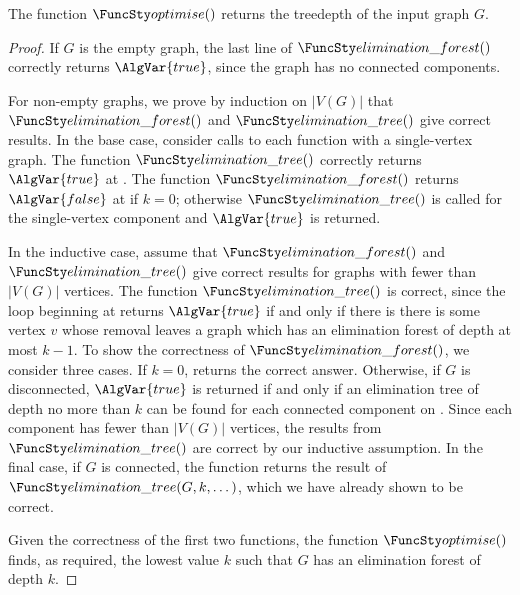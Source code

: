 {    \begin{proposition}\label{correctnessproposition}
      The function $\TDOptimise()$ returns the treedepth of the input graph $G$.
    \end{proposition}
    \begin{proof}
    If $G$ is the empty graph, the last line of $\TDGeneral()$ correctly returns $\AlgVar{true}$, since
      the graph has no connected components.

      For non-empty graphs, we prove by induction on $|V(G)|$ that $\TDGeneral()$ and $\TDConnected()$
      give correct results.  In the base case, consider calls to each function with a single-vertex graph.
      The function $\TDConnected()$ correctly returns $\AlgVar{true}$ at .
      The function $\TDGeneral()$ returns $\AlgVar{false}$ at  if $k=0$; otherwise
      $\TDConnected()$ is called for the single-vertex component and
      $\AlgVar{true}$ is returned.

      In the inductive case, assume that $\TDGeneral()$ and $\TDConnected()$ give correct results for
      graphs with fewer than $|V(G)|$ vertices.  
      The function $\TDConnected()$ is correct, since the loop beginning at 
      returns $\AlgVar{true}$ if and only if 
      there is there is some vertex $v$ whose removal leaves a graph which has an elimination forest of
      depth at most $k-1$.
      To show the correctness of $\TDGeneral()$, we consider three cases.  If $k=0$,  returns
      the correct answer.  Otherwise, if $G$ is disconnected, $\AlgVar{true}$ is returned if and only
      if an elimination tree of depth no more than $k$ can be found for each connected component on
      .
      Since each component has fewer than $|V(G)|$ vertices, the results from $\TDConnected()$ are correct
      by our inductive assumption.
      In the final case, if $G$ is connected, the function returns the result of
      $\TDConnected(G,k,\dots)$, which we have already shown to be correct.

      Given the correctness of the first two functions, the function $\TDOptimise()$ finds,
      as required, the lowest value $k$ such that $G$ has an elimination forest of depth $k$.
    \end{proof}
}
